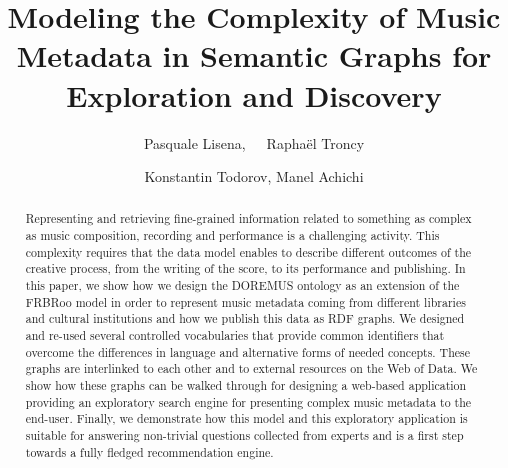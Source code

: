 \documentclass[sigconf]{acmart}
\begin{document}
\title{Modeling the Complexity of Music Metadata in Semantic Graphs for Exploration and Discovery}

\author{Pasquale Lisena,~~~Rapha\"el Troncy}

\author{Konstantin Todorov, Manel Achichi}


\renewcommand{\authors}{Pasquale Lisena, Rapha\"el Troncy, Konstantin Todorov, and Manel Achichi}
\renewcommand{\shortauthors}{P. Lisena et al.}
\renewcommand{\shorttitle}{Modeling the Complexity of Music Metadata in Semantic Graphs}


\begin{abstract}
Representing and retrieving fine-grained information related to something as complex as music composition, recording and performance is a challenging activity. This complexity requires that the data model enables to describe different outcomes of the creative process, from the writing of the score, to its performance and publishing. In this paper, we show how we design the DOREMUS ontology as an extension of the FRBRoo model in order to represent music metadata coming from different libraries and cultural institutions and how we publish this data as RDF graphs. We designed and re-used several controlled vocabularies that provide common identifiers that overcome the differences in language and alternative forms of needed concepts. These graphs are interlinked to each other and to external resources on the Web of Data. We show how these graphs can be walked through for designing a web-based application providing an exploratory search engine for presenting complex music metadata to the end-user. Finally, we demonstrate how this model and this exploratory application is suitable for answering non-trivial questions collected from experts and is a first step towards a fully fledged recommendation engine.
\end{abstract}
\end{document}
